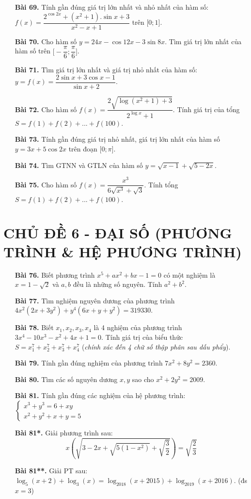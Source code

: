 \documentclass[12pt,a4paper]{article}
\begin{document}
\begin{enumerate}
\item[\textbf{Bài 69.}] Tính gần đúng giá trị lớn nhất và nhỏ nhất của hàm số: $f(x) = \dfrac{2^{\cos 2x} + (x^2 +1).\sin x + 3}{x^2 - x + 1}$ trên $\lbrack 0;1 \rbrack$.
\item[\textbf{Bài 70.}] Cho hàm số $y = 24x - \cos 12x - 3\sin 8x.$ Tìm giá trị lớn nhất của hàm số trên $\bigg\lbrack -\dfrac{\pi}{6};\dfrac{\pi}{6} \bigg\rbrack$.
\item[\textbf{Bài 71.}] Tìm giá trị lớn nhất và giá trị nhỏ nhất của hàm số: $y = f(x) = \dfrac{2\sin x +3\cos x - 1}{\sin x + 2}$.
\item[\textbf{Bài 72.}] Cho hàm số $f(x) = \dfrac{2\sqrt{\log (x^2 + 1) + 3}}{2^{\log x} + 1}$. Tính giá trị của tổng $S = f(1) + f(2) + ... + f(100).$
\item[\textbf{Bài 73.}] Tính gần đúng giá trị nhỏ nhất, giá trị lớn nhất của hàm số $y = 3x + 5\cos 2x$ trên đoạn $\lbrack 0;\pi \rbrack$.
\item[\textbf{Bài 74.}] Tìm GTNN và GTLN của hàm số $y = \sqrt{x-1} + \sqrt{5-2x}$.
\item[\textbf{Bài 75.}] Cho hàm số $f(x) = \dfrac{x^3}{6\sqrt{x^3} + \sqrt{3}}$. Tính tổng $S = f(1) + f(2) + ... + f(100).$
\end{enumerate}
\section*{CHỦ ĐỀ 6 - ĐẠI SỐ (PHƯƠNG TRÌNH \& HỆ PHƯƠNG TRÌNH)}
\begin{enumerate}
\item[\textbf{Bài 76.}] Biết phương trình $x^5 +ax^2 + bx - 1 = 0$ có một nghiệm là $x=1-\sqrt{2}$ và $a,b$ đều là những số nguyên. Tính $a^2 + b^2$.
\item[\textbf{Bài 77.}] Tìm nghiệm nguyên dương của phương trình $4x^2(2x+3y^2) + y^4(6x+y+y^2) = 319330$.
\item[\textbf{Bài 78.}] Biết $x_1,x_2,x_3,x_4$ là 4 nghiệm của phương trình $3x^4 - 10x^3 - x^2 + 4x + 1 = 0$. Tính giá trị của biểu thức $S = x^7_1 + x^7_2 + x^7_3 + x^7_4$ (\textit{chính xác đến 4 chữ số thập phân sau dấu phẩy}).
\item[\textbf{Bài 79.}] Tính gần đúng nghiệm của phương trình $7x^2 + 8y^2 = 2360$.
\item[\textbf{Bài 80.}] Tìm các số nguyên dương $x,y$ sao cho $x^2 + 2y^2 = 2009$.
\item[\textbf{Bài 81.}] Tính gần đúng các nghiệm của hệ phương trình: $\begin{cases}
    x^3 + y^3 = 6 + xy \\
    x^2 + y^2 + x + y = 5
\end{cases}$
\item[\textbf{Bài 81*.}] Giải phương trình sau:  
$$x\left(\sqrt{3-2x + \sqrt{5(1-x^2)} + \sqrt{\frac{3}{2}}} \right) = \sqrt{\frac{2}{3}}$$
\item[\textbf{Bài 81**.}] Giải PT sau: $\log_{5}(x+2) + \log_{3}(x) = \log_{2018}(x+2015) + \log_{2019}(x+2016).$ (đs $x = 3$)
\end{enumerate}
\end{document}
